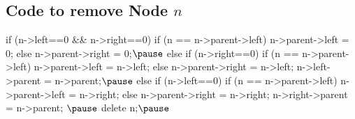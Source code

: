 
\begin{slide}
\section{Code to remove Node $n$}

\begin{PauseHighLight}
\begin{minipage}{11cm}
\begin{java}
  if (n->left==0 && n->right==0) {
     if (n == n->parent->left)
        n->parent->left = 0;
     else
        n->parent->right = 0;$\pause$
  } else if (n->right==0) {
     if (n == n->parent->left)
        n->parent->left = n->left;
     else
        n->parent->right = n->left;
     n->left->parent = n->parent;$\pause$
  } else if (n->left==0) {
     if (n == n->parent->left)
        n->parent->left = n->right;
     else
        n->parent->right = n->right;
     n->right->parent = n->parent;
  }$\pause$
  delete n;$\pause$
\end{java}
\end{minipage}\hspace{1cm}
\begin{minipage}{11cm}
  \pause
\end{minipage}
\end{PauseHighLight}

\end{slide}


